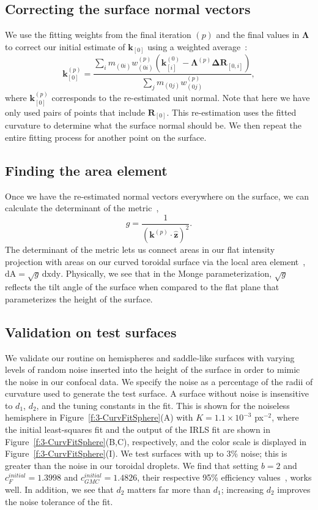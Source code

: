 \subsection{Correcting the surface normal vectors}
We use the fitting weights from the final iteration $(p)$ and the final values in $\bm{\Lambda}$ to correct our initial estimate of $\mathbf{k}_{[0]}$ using a weighted average~\cite{RN31}:
\begin{equation}
\mathbf{k}_{[0]}^{(p)} = \frac{\sum\limits_i m_{(0i)}w_{(0i)}^{(p)}(\mathbf{k}_{[i]}^{(0)} - \mathbf{\Lambda}^{(p)}\mathbf{\Delta R}_{[0,i]})}{\sum\limits_j m_{(0j)}w_{(0j)}^{(p)}},
\end{equation}
where $\mathbf{k}_{[0]}^{(p)}$ corresponds to the re-estimated unit normal.
Note that here we have only used pairs of points that include $\mathbf{R}_{[0]}$.
This re-estimation uses the fitted curvature to determine what the surface normal should be.
We then repeat the entire fitting process for another point on the surface.


\subsection{Finding the area element}
Once we have the re-estimated normal vectors everywhere on the surface, we can calculate the determinant of the metric~\cite{RN35},
\begin{equation}
g = \frac{1}{(\mathbf{k}^{(p)} \cdot \mathbf{\hat{z}})^2}.
\end{equation}
The determinant of the metric lets us connect areas in our flat intensity projection with areas on our curved toroidal surface via the local area element~\cite{RN35}, $\textrm{dA} = \sqrt{g} \, \textrm{dx}\textrm{dy}$.
Physically, we see that in the Monge parameterization, $\sqrt{g}$ reflects the tilt angle of the surface when compared to the flat plane that parameterizes the height of the surface.


\subsection{Validation on test surfaces}
We validate our routine on hemispheres and saddle-like surfaces with varying levels of random noise inserted into the height of the surface in order to mimic the noise in our confocal data.
We specify the noise as a percentage of the radii of curvature used to generate the test surface.
A surface without noise is insensitive to $d_1$, $d_2$, and the tuning constants in the fit.
This is shown for the noiseless hemisphere in Figure~\ref{f:3-CurvFitSphere}(A) with $K = 1.1 \times 10^{-3}$ px$^{-2}$, where the initial least-squares fit and the output of the IRLS fit are shown in Figure~\ref{f:3-CurvFitSphere}(B,C), respectively, and the color scale is displayed in Figure~\ref{f:3-CurvFitSphere}(I).
We test surfaces with up to 3\% noise; this is greater than the noise in our toroidal droplets.
We find that setting $b=2$ and $c_{F}^{initial} = 1.3998$ and $c_{GMC}^{initial}=1.4826$, their respective 95\% efficiency values~\cite{RN52,RN318}, works well.
In addition, we see that $d_2$ matters far more than $d_1$; increasing $d_2$ improves the noise tolerance of the fit.

